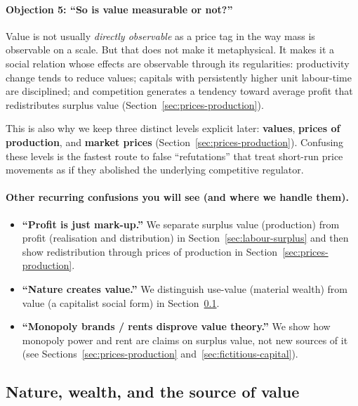 \paragraph{Objection 5: ``So is value measurable or not?''}
Value is not usually \emph{directly observable} as a price tag in the way mass is observable on a scale. But that does not make it metaphysical. It makes it a social
relation whose effects are observable through its regularities: productivity change tends to reduce values; capitals with persistently higher unit labour-time are
disciplined; and competition generates a tendency toward average profit that redistributes surplus value (Section~\ref{sec:prices-production}).\cite{Marx1867,Shaikh2016}

This is also why we keep three distinct levels explicit later: \textbf{values}, \textbf{prices of production}, and \textbf{market prices} (Section~\ref{sec:prices-production}).
Confusing these levels is the fastest route to false ``refutations'' that treat short-run price movements as if they abolished the underlying competitive regulator.

\paragraph{Other recurring confusions you will see (and where we handle them).}
\begin{itemize}[leftmargin=1.5em]
  \item \textbf{``Profit is just mark-up.''} We separate surplus value (production) from profit (realisation and distribution)
  in Section~\ref{sec:labour-surplus} and then show redistribution through prices of production in Section~\ref{sec:prices-production}.
  \item \textbf{``Nature creates value.''} We distinguish use-value (material wealth) from value (a capitalist social form) in
  Section~\ref{sec:nature-value}.
  \item \textbf{``Monopoly brands / rents disprove value theory.''} We show how monopoly power and rent are claims on surplus value,
  not new sources of it (see Sections~\ref{sec:prices-production} and~\ref{sec:fictitious-capital}).
\end{itemize}


\subsection{Nature, wealth, and the source of value}
\label{sec:nature-value}

